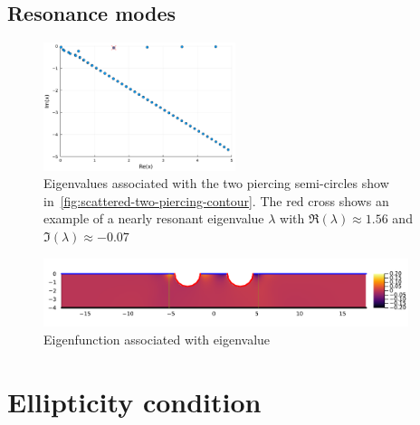 \documentclass[11pt]{article}
\begin{document}
\subsection{Resonance modes}

\begin{figure}
  \centering
  \includegraphics[width=0.5\textwidth]{figures/eigenvalues_two_piercing_depth_4.pdf}
  \caption{Eigenvalues associated with the two piercing semi-circles show
  in~\cref{fig:scattered-two-piercing-contour}. The red cross shows an example
  of a nearly resonant eigenvalue $\lambda$ with $\Re(\lambda) \approx 1.56$ and
 $\Im(\lambda) \approx - 0.07$}
  \label{fig:eigenvalues}
\end{figure}

\begin{figure}
  \centering
  \includegraphics[width=0.95\textwidth]{figures/eigenfunction_two_piercing_depth_4.pdf}
  \caption{Eigenfunction associated with eigenvalue}
  \label{fig:eigenfunction}
\end{figure}

\appendix

\section{Ellipticity condition}\label{sec:elliptic-condition}
\end{document}
